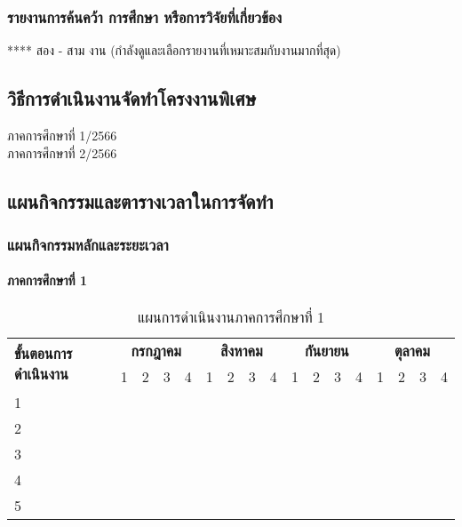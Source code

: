 \documentclass[12pt,a4paper]{article}
\begin{document}
\subsubsection{รายงานการค้นคว้า การศึกษา หรือการวิจัยที่เกี่ยวข้อง}
**** สอง - สาม งาน (กำลังดูและเลือกรายงานที่เหมาะสมกับงานมากที่สุด)

\subsection{วิธีการดำเนินงานจัดทำโครงงานพิเศษ}
ภาคการศึกษาที่ 1/2566\\
ภาคการศึกษาที่ 2/2566

\subsection{แผนกิจกรรมและตารางเวลาในการจัดทำ}

\subsubsection{แผนกิจกรรมหลักและระยะเวลา}

\paragraph{ภาคการศึกษาที่ 1}
\begin{table}[htbp]
    \centering
    \caption{แผนการดำเนินงานภาคการศึกษาที่ 1}
    \begin{tabular}{|l|c|c|c|c|c|c|c|c|c|c|c|c|c|c|c|c|}
        \hline
        \multirow{2}{*}{\textbf{ขั้นตอนการดำเนินงาน}} & \multicolumn{4}{c|}{\textbf{กรกฎาคม}} & \multicolumn{4}{c|}{\textbf{สิงหาคม}} & \multicolumn{4}{c|}{\textbf{กันยายน}} & \multicolumn{4}{c|}{\textbf{ตุลาคม}} \\
        \cline{2-17}
        & 1 & 2 & 3 & 4 & 1 & 2 & 3 & 4 & 1 & 2 & 3 & 4 & 1 & 2 & 3 & 4 \\
        \hline
        1 & & & & & & & & & & & & & & & & \\
        \hline
        2 & & & & & & & & & & & & & & & & \\
        \hline
        3 & & & & & & & & & & & & & & & & \\
        \hline
        4 & & & & & & & & & & & & & & & & \\
        \hline
        5 & & & & & & & & & & & & & & & & \\
        \hline
    \end{tabular}
    \label{tab:semester1}
\end{table}
\end{document}
